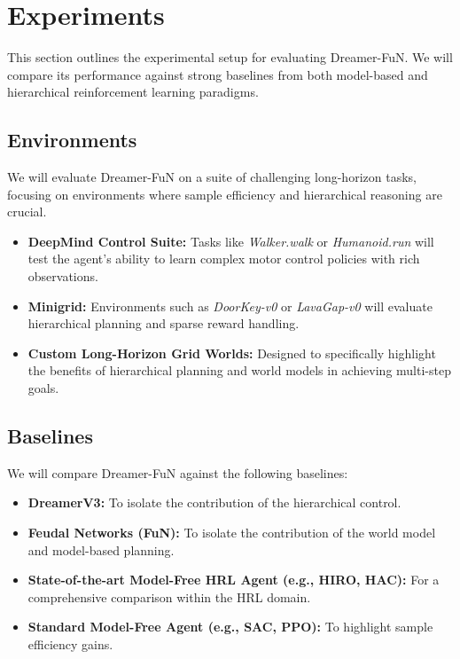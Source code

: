 \documentclass[conference]{IEEEtran}
\begin{document}
\section{Experiments}
This section outlines the experimental setup for evaluating Dreamer-FuN. We will compare its performance against strong baselines from both model-based and hierarchical reinforcement learning paradigms.

\subsection{Environments}
We will evaluate Dreamer-FuN on a suite of challenging long-horizon tasks, focusing on environments where sample efficiency and hierarchical reasoning are crucial.
\begin{itemize}
    \item \textbf{DeepMind Control Suite:} Tasks like \textit{Walker.walk} or \textit{Humanoid.run} will test the agent's ability to learn complex motor control policies with rich observations.
    \item \textbf{Minigrid:} Environments such as \textit{DoorKey-v0} or \textit{LavaGap-v0} will evaluate hierarchical planning and sparse reward handling.
    \item \textbf{Custom Long-Horizon Grid Worlds:} Designed to specifically highlight the benefits of hierarchical planning and world models in achieving multi-step goals.
\end{itemize}

\subsection{Baselines}
We will compare Dreamer-FuN against the following baselines:
\begin{itemize}
    \item \textbf{DreamerV3:} To isolate the contribution of the hierarchical control.
    \item \textbf{Feudal Networks (FuN):} To isolate the contribution of the world model and model-based planning.
    \item \textbf{State-of-the-art Model-Free HRL Agent (e.g., HIRO, HAC):} For a comprehensive comparison within the HRL domain.
    \item \textbf{Standard Model-Free Agent (e.g., SAC, PPO):} To highlight sample efficiency gains.
\end{itemize}
\end{document}
